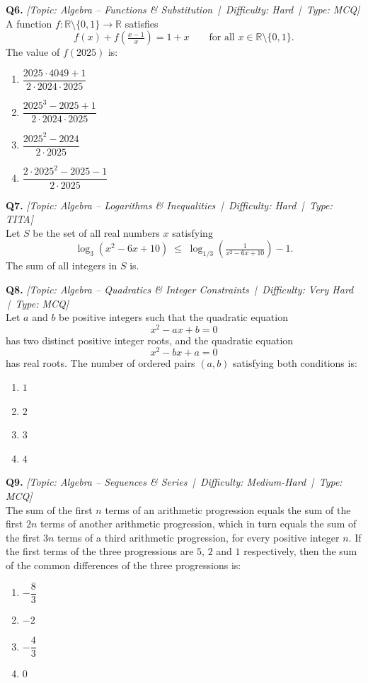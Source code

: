 \documentclass[11pt,a4paper]{article}
\newcommand{\qhead}[4]{\vspace{0.4em}\noindent\textbf{Q#1.} \textit{[Topic: #2 \,|\, Difficulty: #3 \,|\, Type: #4]}\\[0.15em]}
\begin{document}
\qhead{6}{Algebra -- Functions \& Substitution}{Hard}{MCQ}
A function $f:\mathbb{R}\setminus\{0,1\}\to\mathbb{R}$ satisfies
\[ f(x) + f\!\left(\tfrac{x-1}{x}\right) = 1 + x \qquad \text{for all } x \in \mathbb{R}\setminus\{0,1\}. \]
The value of $f(2025)$ is:
\begin{enumerate}[label=(\Alph*),leftmargin=2em]
    \item $\dfrac{2025 \cdot 4049 + 1}{2 \cdot 2024 \cdot 2025}$
    \item $\dfrac{2025^{3} - 2025 + 1}{2 \cdot 2024 \cdot 2025}$
    \item $\dfrac{2025^{2} - 2024}{2 \cdot 2025}$
    \item $\dfrac{2 \cdot 2025^{2} - 2025 - 1}{2 \cdot 2025}$
\end{enumerate}

\qhead{7}{Algebra -- Logarithms \& Inequalities}{Hard}{TITA}
Let $S$ be the set of all real numbers $x$ satisfying
\[ \log_{3}(x^{2} - 6x + 10) \;\le\; \log_{1/3}\!\left(\tfrac{1}{x^{2} - 6x + 10}\right) - 1. \]
The sum of all integers in $S$ is.

\qhead{8}{Algebra -- Quadratics \& Integer Constraints}{Very Hard}{MCQ}
Let $a$ and $b$ be positive integers such that the quadratic equation
\[ x^{2} - ax + b = 0 \]
has two distinct positive integer roots, and the quadratic equation
\[ x^{2} - bx + a = 0 \]
has real roots. The number of ordered pairs $(a, b)$ satisfying both conditions is:
\begin{enumerate}[label=(\Alph*),leftmargin=2em]
    \item $1$
    \item $2$
    \item $3$
    \item $4$
\end{enumerate}

\qhead{9}{Algebra -- Sequences \& Series}{Medium-Hard}{MCQ}
The sum of the first $n$ terms of an arithmetic progression equals the sum of the first $2n$ terms of another arithmetic progression, which in turn equals the sum of the first $3n$ terms of a third arithmetic progression, for every positive integer $n$. If the first terms of the three progressions are $5$, $2$ and $1$ respectively, then the sum of the common differences of the three progressions is:
\begin{enumerate}[label=(\Alph*),leftmargin=2em]
    \item $-\dfrac{8}{3}$
    \item $-2$
    \item $-\dfrac{4}{3}$
    \item $0$
\end{enumerate}
\end{document}
